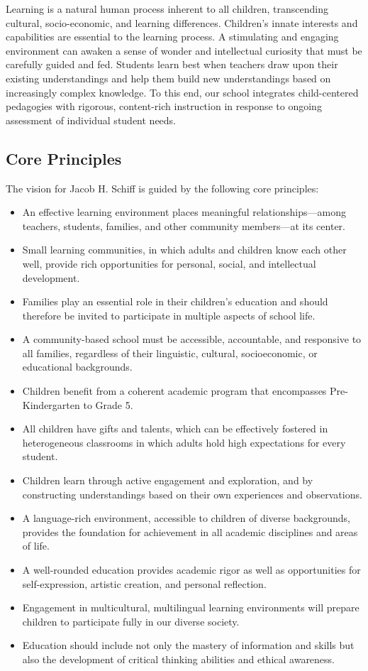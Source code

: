 \documentclass[letterpaper, 11pt]{article}
\begin{document}
Learning is a natural human process inherent to all children, transcending cultural, socio-economic, and learning differences. Children’s innate interests and capabilities are essential to the learning process. A stimulating and engaging environment can awaken a sense of wonder and intellectual curiosity that must be carefully guided and fed. Students learn best when teachers draw upon their existing understandings and help them build new understandings based on increasingly complex knowledge. To this end, our school integrates child-centered pedagogies with rigorous, content-rich instruction in response to ongoing assessment of individual student needs.

\subsection{Core Principles}
\label{sec:org675cd73}
The vision for Jacob H. Schiff is guided by the following core principles:
\begin{itemize}
\item An effective learning environment places meaningful relationships—among teachers, students, families, and other community members—at its center.
\item Small learning communities, in which adults and children know each other well, provide rich opportunities for personal, social, and intellectual development.
\item Families play an essential role in their children’s education and should therefore be invited to participate in multiple aspects of school life.
\item A community-based school must be accessible, accountable, and responsive to all families, regardless of their linguistic, cultural, socioeconomic, or educational backgrounds.
\item Children benefit from a coherent academic program that encompasses Pre-Kindergarten to Grade 5.
\item All children have gifts and talents, which can be effectively fostered in heterogeneous classrooms in which adults hold high expectations for every student.
\item Children learn through active engagement and exploration, and by constructing understandings based on their own experiences and observations.
\item A language-rich environment, accessible to children of diverse backgrounds, provides the foundation for achievement in all academic disciplines and areas of life.
\item A well-rounded education provides academic rigor as well as opportunities for self-expression, artistic creation, and personal reflection.
\item Engagement in multicultural, multilingual learning environments will prepare children to participate fully in our diverse society.
\item Education should include not only the mastery of information and skills but also the development of critical thinking abilities and ethical awareness.
\end{itemize}
\end{document}
